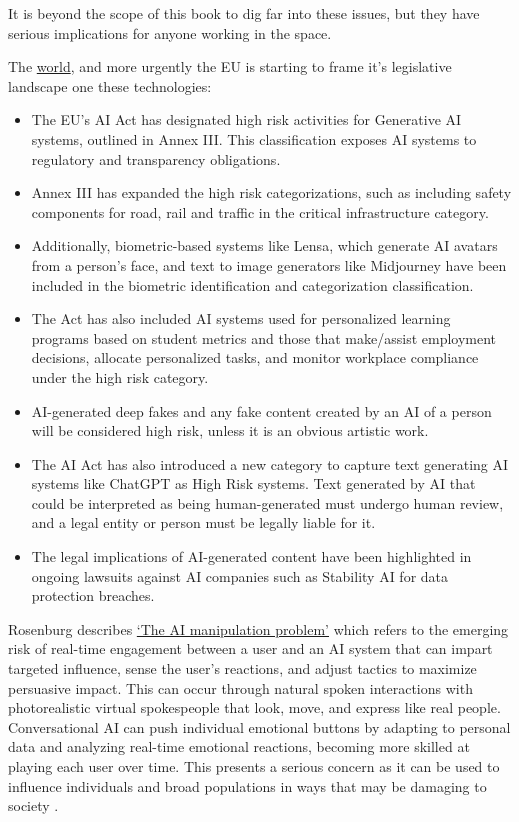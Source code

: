 It is beyond the scope of this book to dig far into these issues, but they have serious implications for anyone working in the space. \par 
The \href{https://www.holisticai.com/papers/the-state-of-ai-regulations-in-2023}{world}, and more urgently the EU is starting to frame it's legislative landscape one these technologies:
\begin{itemize}
\item The EU's AI Act has designated high risk activities for Generative AI systems, outlined in Annex III. This classification exposes AI systems to regulatory and transparency obligations.
\item Annex III has expanded the high risk categorizations, such as including safety components for road, rail and traffic in the critical infrastructure category.
\item Additionally, biometric-based systems like Lensa, which generate AI avatars from a person's face, and text to image generators like Midjourney have been included in the biometric identification and categorization classification.
\item The Act has also included AI systems used for personalized learning programs based on student metrics and those that make/assist employment decisions, allocate personalized tasks, and monitor workplace compliance under the high risk category.
\item AI-generated deep fakes and any fake content created by an AI of a person will be considered high risk, unless it is an obvious artistic work.
\item The AI Act has also introduced a new category to capture text generating AI systems like ChatGPT as High Risk systems. Text generated by AI that could be interpreted as being human-generated must undergo human review, and a legal entity or person must be legally liable for it.
\item The legal implications of AI-generated content have been highlighted in ongoing lawsuits against AI companies such as Stability AI for data protection breaches.
\end{itemize}
Rosenburg describes \href{https://bigthink.com/the-present/danger-conversational-ai/}{`The AI manipulation problem'} which refers to the emerging risk of real-time engagement between a user and an AI system that can impart targeted influence, sense the user's reactions, and adjust tactics to maximize persuasive impact. This can occur through natural spoken interactions with photorealistic virtual spokespeople that look, move, and express like real people. Conversational AI can push individual emotional buttons by adapting to personal data and analyzing real-time emotional reactions, becoming more skilled at playing each user over time. This presents a serious concern as it can be used to influence individuals and broad populations in ways that may be damaging to society \cite{Rosenberg2023}.
